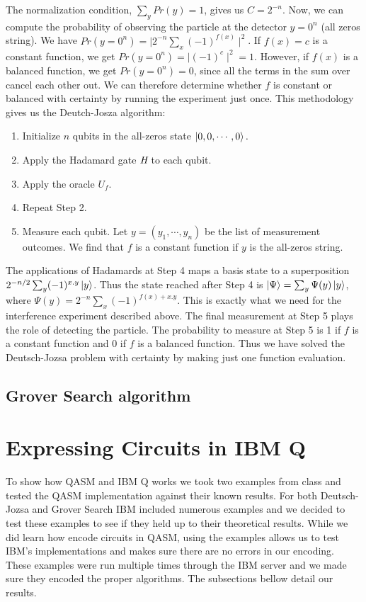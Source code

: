 \documentclass[12pt]{article}
\begin{document}
    \noindent
    The normalization condition, $\sum_{y}Pr(y) = 1$, gives us $C = 2^{-n}$. Now, we can compute the probability  of observing the particle at the detector $y = 0^n$ (all zeros string). We have $Pr(y=0^{n}) = \mid2^{-n}\sum_{x}(-1)^{f(x)}\mid^2$. If $f(x) = c$ is a constant function, we get $Pr(y=0^{n}) = \mid(-1)^c\mid^2 = 1$. However, if $f(x)$ is a balanced function, we get $Pr(y=0^{n}) = 0$, since all the terms in the sum over  cancel each other out. We can therefore determine whether $f$ is constant or balanced with certainty by running the experiment just once. This methodology gives us the Deutch-Josza algorithm:
    
    \begin{enumerate}
        \item Initialize $n$ qubits in the all-zeros state $\ket{0,0,\cdots,0}.$
        \item Apply the Hadamard gate $\mbox{\em{H}}$ to each qubit.
        \item Apply the oracle $U_{f}$.
        \item Repeat Step 2.
        \item  Measure each qubit. Let $y = (y_1, \cdots, y_n)$ be the list of measurement outcomes. We find that $f$ is a constant function if $y$ is the all-zeros string.
    \end{enumerate}
    
    \noindent
   The applications of Hadamards at Step 4 maps a basis state  to a superposition $2^{-n/2}\sum_{y}(-1)^{x.y}\ket{y}$. Thus the state reached after Step 4 is $\ket{\Psi} = \sum_{y}\Psi(y)\ket{y}$, where $\Psi (y) = 2^{-n}\sum_{x}(-1)^{f(x)+x.y}$. This is exactly what we need for the interference experiment described above. The final measurement at Step 5 plays the role of detecting the particle. The probability to measure  at Step 5 is 1 if $f$ is a constant function and 0 if $f$ is a balanced function. Thus we have solved the Deutsch-Jozsa problem with certainty by making just one function evaluation.
    
    
    
    \subsection{Grover Search algorithm}
    
    
    
        
\section{Expressing Circuits in IBM Q}
    To show how QASM and IBM Q works we took two examples from class and tested the QASM implementation against their known results. For both Deutsch-Jozsa and Grover Search IBM included numerous examples and we decided to test these examples to see if they held up to their theoretical results. While we did learn how encode circuits in QASM, using the examples allows us to test IBM's implementations and makes sure there are no errors in our encoding. These examples were run multiple times through the IBM server and we made sure they encoded the proper algorithms. The subsections bellow detail our results.
    
\end{document}
